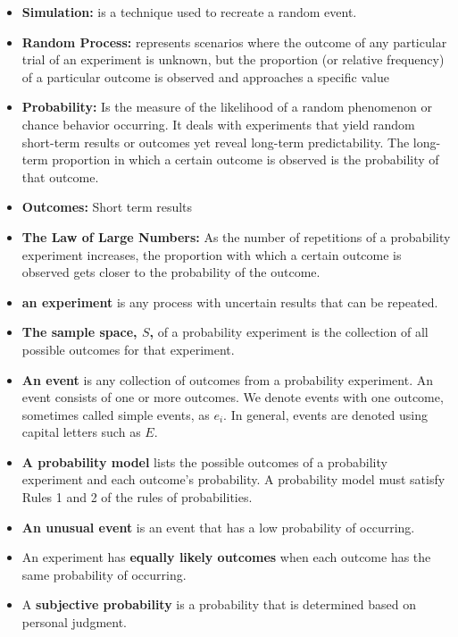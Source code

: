 \documentclass{report}
\begin{document}
    \begin{itemize}
        \item \textbf{Simulation:} is a technique used to recreate a random event.
        \item \textbf{Random Process:} represents scenarios where the outcome of any particular trial of an experiment is unknown, but the proportion (or relative frequency) of a particular outcome is observed and approaches a specific value
        \item \textbf{Probability:} Is the measure of the likelihood of a random phenomenon or chance behavior occurring. It deals with experiments that yield random short-term results or outcomes yet reveal long-term predictability. The long-term proportion in which a certain outcome is observed is the probability of that outcome. 
        \item \textbf{Outcomes:} Short term results
        \item \textbf{The Law of Large Numbers:} As the number of repetitions of a probability experiment increases, the proportion with which a certain outcome is observed gets closer to the probability of the outcome.
        \item \textbf{an experiment} is any process with uncertain results that can be repeated.
        \item \textbf{The sample space, $S$,} of a probability experiment is the collection of all possible outcomes for that experiment.
        \item \textbf{An event} is any collection of outcomes from a probability experiment. An event consists of one or more outcomes. We denote events with one outcome, sometimes called simple events, as $e_{i}$. In general, events are denoted using capital letters such as $ E$.
        \item \textbf{A probability model} lists the possible outcomes of a probability experiment and each outcome's probability. A probability model must satisfy Rules 1 and 2 of the rules of probabilities.
        \item  \textbf{An unusual event} is an event that has a low probability of occurring.
        \item An experiment has \textbf{equally likely outcomes} when each outcome has the same probability of occurring. 
        \item A \textbf{subjective probability} is a probability that is determined based on personal judgment.
    \end{itemize}
\end{document}
